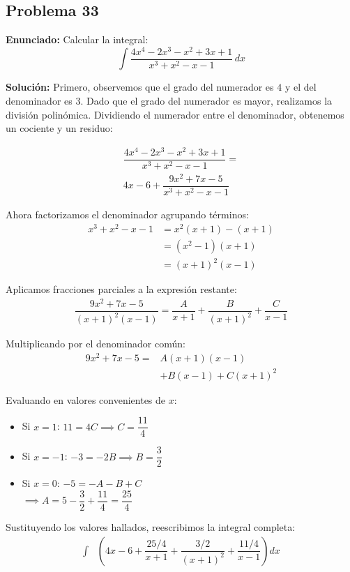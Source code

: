 \subsection*{Problema 33}
\textbf{Enunciado:} Calcular la integral:
\begin{equation*}
\int \dfrac{4x^4 - 2x^3 - x^2 + 3x + 1}{x^3 + x^2 - x - 1} \, dx
\end{equation*}

\textbf{Solución:} 
Primero, observemos que el grado del numerador es $4$ y el del denominador es $3$. Dado que el grado del numerador es mayor, realizamos la división polinómica. Dividiendo el numerador entre el denominador, obtenemos un cociente y un residuo:

\begin{align*}
\dfrac{4x^4 - 2x^3 - x^2 + 3x + 1}{x^3 + x^2 - x - 1} = \\
4x - 6 + \dfrac{9x^2 + 7x - 5}{x^3 + x^2 - x - 1}
\end{align*}

Ahora factorizamos el denominador agrupando términos:
\begin{align*}
x^3 + x^2 - x - 1 &= x^2(x + 1) - (x + 1) \\
&= (x^2 - 1)(x + 1) \\
&= (x + 1)^2(x - 1)
\end{align*}

Aplicamos fracciones parciales a la expresión restante:
\begin{align*}
\dfrac{9x^2 + 7x - 5}{(x + 1)^2(x - 1)} = \dfrac{A}{x + 1} + \dfrac{B}{(x + 1)^2} + \dfrac{C}{x - 1}
\end{align*}

Multiplicando por el denominador común:
\begin{align*}
9x^2 + 7x - 5 = &A(x + 1)(x - 1) \\
&+ B(x - 1) + C(x + 1)^2
\end{align*}

Evaluando en valores convenientes de $x$:
\begin{itemize}
    \item Si $x = 1$: $11 = 4C \implies C = \dfrac{11}{4}$
    \item Si $x = -1$: $-3 = -2B \implies B = \dfrac{3}{2}$
    \item Si $x = 0$: $-5 = -A - B + C$ \\
    $\implies A = 5 - \dfrac{3}{2} + \dfrac{11}{4} = \dfrac{25}{4}$
\end{itemize}

Sustituyendo los valores hallados, reescribimos la integral completa:
\begin{align*}
\int &\left( 4x - 6 + \dfrac{25/4}{x + 1} + \dfrac{3/2}{(x + 1)^2} + \dfrac{11/4}{x - 1} \right) dx
\end{align*}


